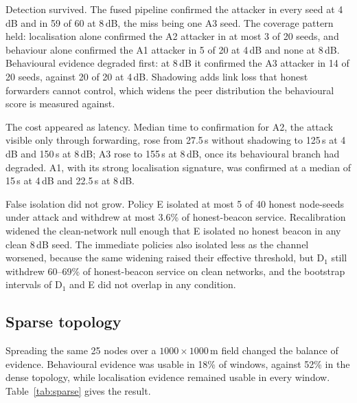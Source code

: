 \documentclass[pdflatex,sn-mathphys-num]{sn-jnl}%
\theoremstyle{thmstyleone}%
\theoremstyle{thmstyletwo}%
\theoremstyle{thmstylethree}%
\begin{document}
Detection survived. The fused pipeline confirmed the attacker in every seed at
4\,dB and in 59 of 60 at 8\,dB, the miss being one A3 seed. The coverage
pattern held: localisation alone confirmed the A2 attacker in at most 3 of 20
seeds, and behaviour alone confirmed the A1 attacker in 5 of 20 at 4\,dB and
none at 8\,dB. Behavioural evidence degraded first: at 8\,dB it confirmed the
A3 attacker in 14 of 20 seeds, against 20 of 20 at 4\,dB. Shadowing adds link
loss that honest forwarders cannot control, which widens the peer distribution
the behavioural score is measured against.

The cost appeared as latency. Median time to confirmation for A2, the attack
visible only through forwarding, rose from 27.5\,s without shadowing to
125\,s at 4\,dB and 150\,s at 8\,dB; A3 rose to 155\,s at 8\,dB, once its
behavioural branch had degraded. A1, with its strong localisation signature,
was confirmed at a median of 15\,s at 4\,dB and 22.5\,s at 8\,dB.

False isolation did not grow. Policy E isolated at most 5 of 40 honest
node-seeds under attack and withdrew at most 3.6\% of honest-beacon service.
Recalibration widened the clean-network null enough that E isolated no honest
beacon in any clean 8\,dB seed. The immediate policies also isolated less as
the channel worsened, because the same widening raised their effective
threshold, but D$_1$ still withdrew 60--69\% of honest-beacon service on clean
networks, and the bootstrap intervals of D$_1$ and E did not overlap in any
condition.

\subsection{Sparse topology}
\label{sec:sparse}

Spreading the same 25 nodes over a $1000 \times 1000$\,m field changed the
balance of evidence. Behavioural evidence was usable in 18\% of windows,
against 52\% in the dense topology, while localisation evidence remained
usable in every window. Table~\ref{tab:sparse} gives the result.
\end{document}
